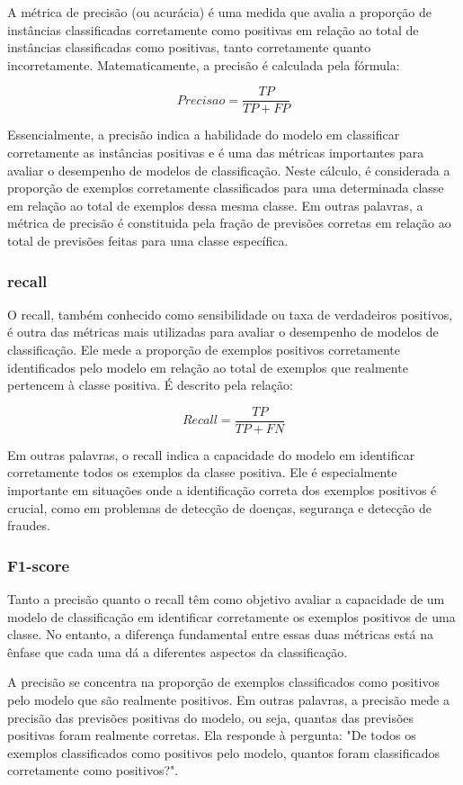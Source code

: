\documentclass[tcc2]{uftex}
\begin{document}
A métrica de precisão (ou acurácia) é uma medida que avalia a proporção de instâncias classificadas corretamente como positivas em relação ao total de instâncias classificadas como positivas, tanto corretamente quanto incorretamente. Matematicamente, a precisão é calculada pela fórmula:

\[
    Precisao = \frac{TP}{TP+FP}
\]

Essencialmente, a precisão indica a habilidade do modelo em classificar corretamente as instâncias positivas e é uma das métricas importantes para avaliar o desempenho de modelos de classificação. Neste cálculo, é considerada a proporção de exemplos corretamente classificados para uma determinada classe em relação ao total de exemplos dessa mesma classe. Em outras palavras, a métrica de precisão é constituida pela fração de previsões corretas em relação ao total de previsões feitas para uma classe específica.


\subsubsection{recall}

O recall, também conhecido como sensibilidade ou taxa de verdadeiros positivos, é outra das métricas mais utilizadas para avaliar o desempenho de modelos de classificação. Ele mede a proporção de exemplos positivos corretamente identificados pelo modelo em relação ao total de exemplos que realmente pertencem à classe positiva. É descrito pela relação:

\[
    Recall = \frac{TP}{TP+FN}
\]

Em outras palavras, o recall indica a capacidade do modelo em identificar corretamente todos os exemplos da classe positiva. Ele é especialmente importante em situações onde a identificação correta dos exemplos positivos é crucial, como em problemas de detecção de doenças, segurança e detecção de fraudes.

\subsubsection{F1-score}

Tanto a precisão quanto o recall têm como objetivo avaliar a capacidade de um modelo de classificação em identificar corretamente os exemplos positivos de uma classe. No entanto, a diferença fundamental entre essas duas métricas está na ênfase que cada uma dá a diferentes aspectos da classificação.

A precisão se concentra na proporção de exemplos classificados como positivos pelo modelo que são realmente positivos. Em outras palavras, a precisão mede a precisão das previsões positivas do modelo, ou seja, quantas das previsões positivas foram realmente corretas. Ela responde à pergunta: "De todos os exemplos classificados como positivos pelo modelo, quantos foram classificados corretamente como positivos?".
\end{document}
